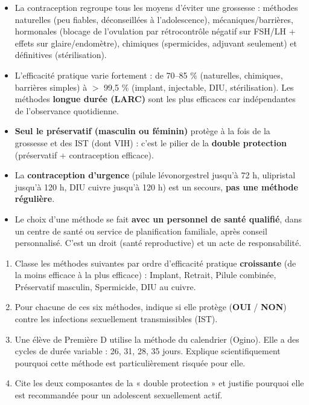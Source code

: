 \documentclass[11pt]{article}
\newcommand{\cle}[1]{{\popxbold\color{popdark}#1}}
\begin{document}
\begin{aretenir}
\begin{itemize}
\item La \cle{contraception} regroupe tous les moyens d'éviter une grossesse : méthodes naturelles (peu fiables, déconseillées à l'adolescence), mécaniques/barrières, hormonales (blocage de l'ovulation par rétrocontrôle négatif sur FSH/LH + effets sur glaire/endomètre), chimiques (spermicides, adjuvant seulement) et définitives (stérilisation).
\item L'\cle{efficacité pratique} varie fortement : de 70--85 \% (naturelles, chimiques, barrières simples) à $>$ 99,5 \% (implant, injectable, DIU, stérilisation). Les méthodes \textbf{longue durée (LARC)} sont les plus efficaces car indépendantes de l'observance quotidienne.
\item \textbf{Seul le préservatif (masculin ou féminin)} protège à la fois de la grossesse et des IST (dont VIH) : c'est le pilier de la \textbf{double protection} (préservatif + contraception efficace).
\item La \textbf{contraception d'urgence} (pilule lévonorgestrel jusqu'à 72 h, ulipristal jusqu'à 120 h, DIU cuivre jusqu'à 120 h) est un secours, \textbf{pas une méthode régulière}.
\item Le choix d'une méthode se fait \textbf{avec un personnel de santé qualifié}, dans un centre de santé ou service de planification familiale, après conseil personnalisé. C'est un droit (santé reproductive) et un acte de responsabilité.
\end{itemize}
\end{aretenir}

\begin{exercice}
\begin{enumerate}
\item Classe les méthodes suivantes par ordre d'efficacité pratique \textbf{croissante} (de la moins efficace à la plus efficace) : Implant, Retrait, Pilule combinée, Préservatif masculin, Spermicide, DIU au cuivre.
\item Pour chacune de ces six méthodes, indique si elle protège (\textbf{OUI} / \textbf{NON}) contre les infections sexuellement transmissibles (IST).
\item Une élève de Première D utilise la méthode du calendrier (Ogino). Elle a des cycles de durée variable : 26, 31, 28, 35 jours. Explique scientifiquement pourquoi cette méthode est particulièrement risquée pour elle.
\item Cite les deux composantes de la « double protection » et justifie pourquoi elle est recommandée pour un adolescent sexuellement actif.
\end{enumerate}
\end{exercice}
\end{document}
